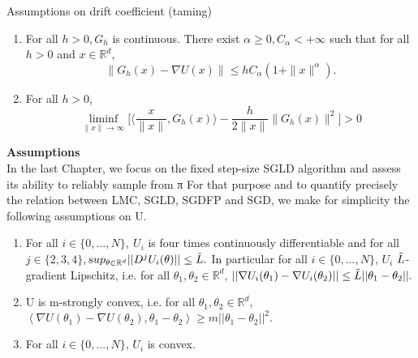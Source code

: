 \documentclass[a4paper]{article}
\theoremstyle{definition}
\newcommand{\R}{\mathbb{R}}
\begin{document}
Assumptions on drift coefficient (taming)
\begin{enumerate}[label={\bf A{\arabic*}}]
	\item  For all \(h>0, G_h\) is continuous. There exist \(\alpha\geq 0, C_{\alpha}<+\infty\) such that for all \(h >0 \) and \(x \in \R^d\),
	\[\|G_h(x)-\nabla U(x)\| \leq hC_{\alpha}(1+\|x\|^{\alpha}).\]
	\item For all \(h>0\),
	\[ \liminf_{\|x\|\to \infty} \bigg\lbrack \bigg\langle \frac{x}{\|x\|}, G_h(x)\bigg\rangle - \frac{h}{2\|x\|}\|G_h(x)\|^2\bigg\rbrack >0\]
\end{enumerate}
\textbf{Assumptions}\\
In the last Chapter, we focus on the fixed step-size SGLD algorithm and assess its ability to reliably sample from π
For that purpose and to quantify precisely the relation between LMC, SGLD, SGDFP and SGD, we make for simplicity the
following assumptions on U. \cite{pitfalls}
\begin{enumerate}[label={\bf H\arabic*}]
    \item    For all $i \in \{0,...,N\}, \ U_i$ is four times continuously differentiable and for all $j \in \{2, 3, 4\},$$sup_{\theta \in \mathbb{R}^d}||D^j U_i(\theta)||\leq \Tilde{L}.$ In particular for all $i\in \{0, ..., N\}$, $U_i$ $\Tilde{L}$-gradient Lipschitz, i.e. for all $\theta_1, \theta_2\in \mathbb{R}^d$, $||\nabla U_i(\theta_1) - \nabla U_i (\theta_2)|| \leq \Tilde{L}||\theta_1 - \theta_2||.$
    \item U is m-strongly convex, i.e. for all $\theta_1, \theta_2 \in \mathbb{R}^d$,$\left< \nabla U(\theta_1) - \nabla U(\theta_2), \theta_1 - \theta_2\right>\geq m ||\theta_1 - \theta_2||^2.$
    \item For all $i\in\{0,...,N\}$, $U_i$ is convex.
\end{enumerate}
\end{document}
